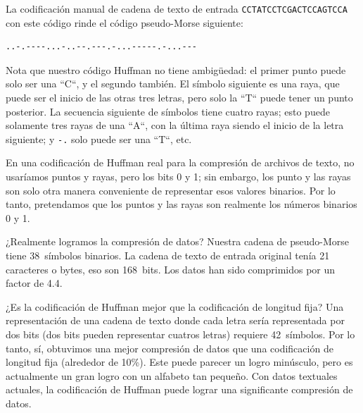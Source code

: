 La codificación manual de cadena de texto de entrada 
\verb|CCTATCCTCGACTCCAGTCCA| con este código rinde el 
código pseudo-Morse siguiente:

\begin{verbatim}
..-.----...-..--.---.-...-----.-...---
\end{verbatim}

Nota que nuestro código Huffman no tiene ambigüedad:
el primer punto puede solo ser una ``C``, y el segundo también.
El símbolo siguiente es una raya, que puede ser el inicio de 
las otras tres letras, pero solo la	 ``T`` puede tener un punto 
posterior. La secuencia siguiente de símbolos tiene cuatro 
rayas; esto puede solamente tres rayas de una ``A``, con la 
última raya siendo el inicio de la letra siguiente; y \verb|-.|
solo puede ser una ``T``, etc.

En una codificación de Huffman real para la compresión de
archivos de texto, no usaríamos puntos y rayas, pero los 
bits 0 y 1; sin embargo, los punto y las rayas son solo
otra manera conveniente de representar esos valores
binarios. Por lo tanto, pretendamos que los puntos y las
rayas son realmente los números binarios 0 y 1.

¿Realmente logramos la compresión de datos? Nuestra cadena
de pseudo-Morse tiene 38~símbolos binarios. La cadena de 
texto de entrada original tenía 21 caracteres o bytes, eso 
son 168~bits. Los datos han sido comprimidos por un factor
de 4.4. 

¿Es la codificación de Huffman mejor que la codificación de 
longitud fija? Una representación de una cadena de texto donde
cada letra sería representada por dos bits (dos bits pueden
representar cuatros letras) requiere 42~símbolos. Por lo tanto,
sí, obtuvimos una mejor compresión de datos que una codificación
de longitud fija (alrededor de 10\%). Este puede parecer un logro
minúsculo, pero es actualmente un gran logro con un alfabeto tan
pequeño. Con datos textuales actuales, la codificación de Huffman
puede lograr una significante compresión de datos.



